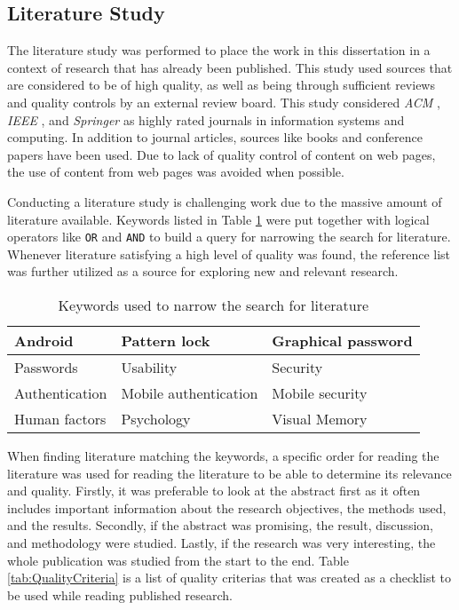     \subsection{Literature Study}\label{sec:methodliteraturereview}
      The literature study was performed to place the work in this dissertation in a context of research that has already been published. This study used sources that are considered to be of high quality, as well as being through sufficient reviews and quality controls by an external review board. This study considered {\it ACM} \cite{ACM}, {\it IEEE} \cite{IEEE}, and {\it Springer} \cite{Springer} as highly rated journals in information systems and computing. In addition to journal articles, sources like books and conference papers have been used. Due to lack of quality control of content on web pages, the use of content from web pages was avoided when possible.

      Conducting a literature study is challenging work due to the massive amount of literature available. Keywords listed in Table \ref{tab:keywords} were put together with logical operators like \texttt{OR} and \texttt{AND} to build a query for narrowing the search for literature. Whenever literature satisfying a high level of quality was found, the reference list was further utilized as a source for exploring new and relevant research. 

      \begin{table}[H]
          \centering
          \begin{tabular}{| l | l | l |}
            \hline
            Android & Pattern lock & Graphical password \\ \hline
            Passwords & Usability & Security \\ \hline
            Authentication & Mobile authentication & Mobile security \\ \hline
            Human factors & Psychology & Visual Memory \\ \hline
          \end{tabular}
          \caption{Keywords used to narrow the search for literature}
          \label{tab:keywords}
        \end{table}

      When finding literature matching the keywords, a specific order for reading the literature was used for reading the literature to be able to determine its relevance and quality. Firstly, it was preferable to look at the abstract first as it often includes important information about the research objectives, the methods used, and the results. Secondly, if the abstract was promising, the result, discussion, and methodology were studied. Lastly, if the research was very interesting, the whole publication was studied from the start to the end. Table \ref{tab:QualityCriteria} is a list of quality criterias that was created as a checklist to be used while reading published research.

